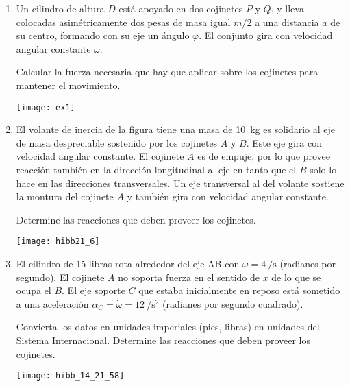 \documentclass[11pt, spanish, a4paper, twoside]{article}
\begin{document}
\begin{enumerate}
\item 
\begin{minipage}[t][3.5cm]{0.6\textwidth}
Un cilindro de altura \(D\) está apoyado en dos cojinetes \(P\) y \(Q\), y lleva colocadas asimétricamente dos pesas de masa igual \(m/2\) a una distancia \(a\) de su centro, formando con su eje un ángulo \(\varphi\).
El conjunto gira con velocidad angular constante \(\omega\).
\begin{tasks} 
	\task Calcular la fuerza necesaria que hay que aplicar sobre los cojinetes para mantener el movimiento.
\end{tasks}
\end{minipage}
\begin{minipage}[c][0.5cm][t]{0.35\textwidth}
	\texttt{[image: ex1]}
\end{minipage}



\item 
\begin{minipage}[t][4.5cm]{0.65\textwidth}
El volante de inercia de la figura tiene una masa de \SI{10}{\kilo\gram} es solidario al eje de masa despreciable sostenido por los cojinetes \(A\) y \(B\).
Este eje gira con velocidad angular constante.
El cojinete \(A\) es de empuje, por lo que provee reacción también en la dirección longitudinal al eje en tanto que el \(B\) solo lo hace en las direcciones transversales.
Un eje transversal al del volante sostiene la montura del cojinete \(A\) y también gira con velocidad angular constante.
\begin{tasks} 
	\task Determine las reacciones que deben proveer los cojinetes.
\end{tasks}
\end{minipage}
\begin{minipage}[c][0.5cm][t]{0.3\textwidth}
	\texttt{[image: hibb21\_6]}
\end{minipage}



\item 
\begin{minipage}[t][3cm]{0.7\textwidth}
El cilindro de 15 libras rota alrededor del eje AB con \(\omega = \SI{4}{\per\second}\) (radianes por segundo).
El cojinete \(A\) no soporta fuerza en el sentido de \(x\) de lo que se ocupa el \(B\).
El eje soporte \(C\) que estaba inicialmente en reposo está sometido a una aceleración \(\alpha_C = \dot{\omega} = \SI{12}{\per\second\squared}\) (radianes por segundo cuadrado). 
\begin{tasks}
	\task Convierta los datos en unidades imperiales (pies, libras) en unidades del Sistema Internacional.
	\task Determine las reacciones que deben proveer los cojinetes.
\end{tasks}
\end{minipage}
\begin{minipage}[c][2cm][t]{0.25\textwidth}
	\texttt{[image: hibb\_14\_21\_58]}
\end{minipage}




\end{enumerate}
\end{document}
